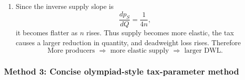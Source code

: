 \documentclass[12pt]{article}
\begin{document}
\begin{enumerate}[label=(\alph*)]
    With tax \(t=5\), buyer-side inverse supply is
    \[
    p_{S,t}(Q)=\frac{Q}{4n}+\frac{15}{2}.
    \]
    Therefore
    \[
    \frac{25}{2}-\frac{Q}{80}=\frac{Q}{4n}+\frac{15}{2}
    \quad\Longrightarrow\quad
    5=Q\frac{n+20}{80n},
    \]
    so
    \[
    Q_t(n)=\frac{400n}{n+20}.
    \]
    Hence
    \[
    DWL(n)=\frac12\cdot 5\left(Q_0(n)-Q_t(n)\right)
    =\frac12\cdot 5\cdot \frac{400n}{n+20}
    =\frac{1000n}{n+20}.
    \]
    Therefore
    \[
    \boxed{DWL(n)=\frac{1000n}{n+20}.}
    \]

    \item
    Since the inverse supply slope is
    \[
    \frac{dp_S}{dQ}=\frac{1}{4n},
    \]
    it becomes flatter as \(n\) rises. Thus supply becomes more elastic, the tax causes a larger reduction in quantity, and deadweight loss rises. Therefore
    \[
    \boxed{\text{More producers } \Rightarrow \text{ more elastic supply } \Rightarrow \text{ larger DWL}.}
    \]
\end{enumerate}

\newpage
\subsubsection{Method 3: Concise olympiad-style tax-parameter method}
\end{document}
